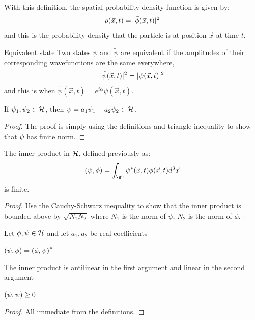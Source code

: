 \documentclass[../Main.tex]{subfiles}
\begin{document}
With this definition, the spatial probability density function is given by:
\begin{equation*}
    \rho(\vec{x}, t) = \lvert\bar{\phi}(\vec{x}, t)\rvert^2
\end{equation*}
and this is the probability density that the particle is at position $\vec{x}$ at time $t$.
\begin{definition}{Equivalent state}
    Two states $\psi$ and $\tilde{\psi}$ are \underline{equivalent} if the amplitudes of their corresponding wavefunctions are the same everywhere,
    \begin{equation*}
        \lvert\tilde{\psi}(\vec{x}, t)\rvert^2 = \lvert\psi(\vec{x}, t)\rvert^2
    \end{equation*}
    and this is when $\tilde{\psi}(\vec{x}, t) = e^{i\alpha}\psi(\vec{x}, t)$.
\end{definition}
\begin{proposition}
    If $\psi_1, \psi_2 \in \mathcal{H}$, then $\psi = a_1 \psi_1 + a_2 \psi_2 \in \mathcal{H}$.
    \label{propWFLinearCombo}
\end{proposition}
\begin{proof}
    The proof is simply using the definitions and triangle inequality to show that $\psi$ has finite norm.
\end{proof}
\begin{proposition}
    The inner product in $\mathcal{H}$, defined previously as:
    \begin{equation*}
        \inn{\psi}{\phi} = \int_{\R^3} \psi^*(\vec{x}, t) \phi(\vec{x}, t) d^3\vec{x}
    \end{equation*}
    is finite.
    \label{propInnerProd}
\end{proposition}
\begin{proof}
    Use the Cauchy-Schwarz inequality to show that the inner product is bounded above by $\sqrt{N_1N_2}$ where $N_1$ is the norm of $\psi$, $N_2$ is the norm of $\phi$.
\end{proof}
\begin{propositions}{
        Let $\phi, \psi \in \mathcal{H}$ and let $a_1, a_2$ be real coefficients
        \label{propsInnerProd}
    }
    \item $\left(\psi,\phi\right) = \left(\phi,\psi\right)^*$ \label{propInnerProdConjSymmetry}
    \item The inner product is antilinear in the first argument and linear in the second argument \label{propInnerProdLinear}
    \item $\left(\psi,\psi\right) \geq 0$ \label{eqnNormPositive}
\end{propositions}
\begin{proof}
    All immediate from the definitions.
\end{proof}
\end{document}
